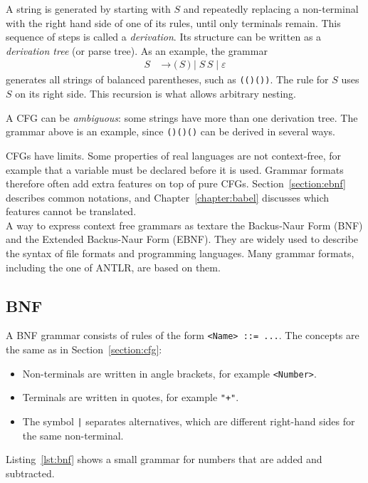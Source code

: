 \documentclass[thesis]{plai}
\begin{document}
A string is generated by starting with $S$ and repeatedly replacing a non-terminal with the right hand side of one of its rules, until only terminals remain. This sequence of steps is called a \emph{derivation}. Its structure can be written as a \emph{derivation tree} (or parse tree). As an example, the grammar
\begin{align*}
    S &\rightarrow \texttt{(}\, S \,\texttt{)} \mid S\,S \mid \varepsilon
\end{align*}
generates all strings of balanced parentheses, such as \texttt{(()())}. The rule for $S$ uses $S$ on its right side. This recursion is what allows arbitrary nesting.

A CFG can be \emph{ambiguous}: some strings have more than one derivation tree. The grammar above is an example, since \texttt{()()()} can be derived in several ways.

CFGs have limits. Some properties of real languages are not context-free, for example that a variable must be declared before it is used. Grammar formats therefore often add extra features on top of pure CFGs. Section~\ref{section:ebnf} describes common notations, and Chapter~\ref{chapter:babel} discusses which features cannot be translated.
\newline \\
\label{section:ebnf}
A way to express context free grammars as textare the Backus-Naur Form (BNF) and the Extended Backus-Naur Form (EBNF). They are widely used to describe the syntax of file formats and programming languages. Many grammar formats, including the one of ANTLR, are based on them.

\subsection{BNF}
A BNF grammar consists of rules of the form \verb|<Name> ::= ...|. The concepts are the same as in Section~\ref{section:cfg}:
\begin{itemize}
    \item Non-terminals are written in angle brackets, for example \verb|<Number>|.
    \item Terminals are written in quotes, for example \verb|"+"|.
    \item The symbol \verb#|# separates alternatives, which are different right-hand sides for the same non-terminal.
\end{itemize}

Listing~\ref{lst:bnf} shows a small grammar for numbers that are added and subtracted.
\end{document}
